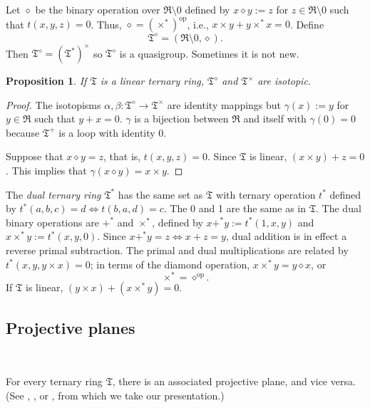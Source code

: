 \documentclass[reqno,12pt]{amsart}
\newtheorem{prop}[thm]{Proposition}
\theoremstyle{remark}
\numberwithin{equation}{section}
\numberwithin{figure}{section}
\newcommand \opp{^\mathrm{op}}
\newcommand \fR{\mathfrak R}
\newcommand \fT{\mathfrak T}
\begin{document}
Let $\diamond$ be the binary operation over $\fR\setminus {0}$ defined by $x \diamond y := z$ for $z \in \fR \setminus {0}$ such that $t(x,y,z) =0$.  Thus, $\diamond = (\times^*)\opp$, i.e., $x\times y + y\times^*x = 0$.  Define 
$$
\fT^{\diamond} = (\fR\setminus {0}, \diamond).
$$
Then $\fT^{\diamond} = (\fT^*)^\times$ so $\fT^\diamond$ is a quasigroup.  Sometimes it is not new.

\begin{prop} \label{P:Tlinear}
If $\fT$ is a linear ternary ring, $\fT^{\diamond}$ and $\fT^\times$ are isotopic.
\end{prop}

\begin{proof} 
The isotopisms $\alpha, \beta : \fT^{\diamond} \to \fT^\times$ are identity mappings but $\gamma(x) := y$ for $y \in \fR $ such that $y+x=0$.  $\gamma$ is a bijection between $\fR$ and itself with $\gamma(0) = 0$ because $\fT^+$ is a loop with identity $0$.  

Suppose that $x \diamond y = z$, that is, $t(x,y,z) = 0$. Since $\fT$ is linear, $(x\times y)+z = 0$. This implies that $\gamma(x \diamond y) = x\times y$.
\end{proof}

The \emph{dual ternary ring} $\fT^*$ has the same set as $\fT$ with ternary operation $t^*$ defined by $t^*(a,b,c)=d \iff t(b,a,d)=c$.  The 0 and 1 are the same as in $\fT$.  The dual binary operations are $+^*$ and $\times^*$, defined by $x +^* y := t^*(1,x,y)$ and $x \times^* y := t^*(x,y,0)$.  
Since $x+^*y = z \iff x+z = y$, dual addition is in effect a reverse primal subtraction.  
The primal and dual multiplications are related by $t^*(x,y,y\times x) = 0$; in terms of the diamond operation, $x\times^*y = y\diamond x$, or 
%
\begin{equation}
\times^* = \diamond\opp.
\label{E:diamonddual}
\end{equation}
%
If $\fT$ is linear, $(y\times x) + (x\times^*y) = 0$.


\subsection{Projective planes}\label{pp}\

For every ternary ring $\fT$, there is an associated projective plane, and vice versa.  (See \cite[Section 8.3]{Latin}, \cite[Section V.3]{HP}, or \cite[Section 9.2, esp.\ Theorem 9.2.2 and Construction 9.2.4]{st}, from which we take our presentation.)  
\end{document}
